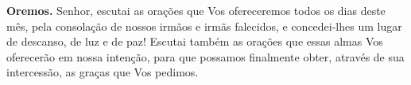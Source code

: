 \vspace{\baselineskip}\noindent \textbf{Oremos.} Senhor, escutai as orações que Vos ofereceremos todos os dias deste mês, pela consolação de nossos irmãos e irmãs falecidos, e concedei-lhes um lugar de descanso, de luz e de paz! Escutai também as orações que essas almas Vos oferecerão em nossa intenção, para que possamos finalmente obter, através de sua intercessão, as graças que Vos pedimos.
